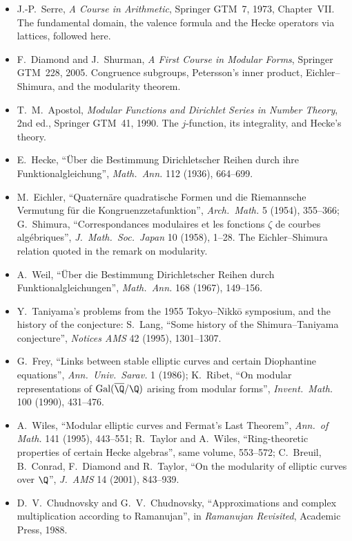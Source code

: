 \begin{itemize}
\item J.-P.~Serre, \emph{A Course in Arithmetic}, Springer GTM~7, 1973, Chapter~VII. The fundamental domain, the valence formula and the Hecke operators via lattices,
followed here.
\item F.~Diamond and J.~Shurman, \emph{A First Course in Modular Forms}, Springer GTM~228, 2005. Congruence subgroups, Petersson's inner product, Eichler--Shimura, and the
modularity theorem.
\item T.~M.~Apostol, \emph{Modular Functions and Dirichlet Series in Number Theory}, 2nd ed., Springer GTM~41, 1990. The $j$-function, its integrality, and Hecke's theory.
\item E.~Hecke, ``\"Uber die Bestimmung Dirichletscher Reihen durch ihre Funktionalgleichung'', \emph{Math.\ Ann.} 112 (1936), 664--699.
\item M.~Eichler, ``Quatern\"are quadratische Formen und die Riemannsche Vermutung f\"ur die Kongruenzzetafunktion'', \emph{Arch.\ Math.} 5 (1954), 355--366;
G.~Shimura, ``Correspondances modulaires et les fonctions $\zeta$ de courbes alg\'ebriques'', \emph{J.\ Math.\ Soc.\ Japan} 10 (1958), 1--28.
The Eichler--Shimura relation quoted in the remark on modularity.
\item A.~Weil, ``\"Uber die Bestimmung Dirichletscher Reihen durch Funktionalgleichungen'', \emph{Math.\ Ann.} 168 (1967), 149--156.
\item Y.~Taniyama's problems from the 1955 Tokyo--Nikk\=o symposium, and the history of the conjecture: S.~Lang, ``Some history of the Shimura--Taniyama conjecture'',
\emph{Notices AMS} 42 (1995), 1301--1307.
\item G.~Frey, ``Links between stable elliptic curves and certain Diophantine equations'', \emph{Ann.\ Univ.\ Sarav.} 1 (1986); K.~Ribet, ``On modular representations of
$\mathrm{Gal}(\overline{\Q}/\Q)$ arising from modular forms'', \emph{Invent.\ Math.} 100 (1990), 431--476.
\item A.~Wiles, ``Modular elliptic curves and Fermat's Last Theorem'', \emph{Ann.\ of Math.} 141 (1995), 443--551; R.~Taylor and A.~Wiles, ``Ring-theoretic properties of certain
Hecke algebras'', same volume, 553--572; C.~Breuil, B.~Conrad, F.~Diamond and R.~Taylor, ``On the modularity of elliptic curves over $\Q$'', \emph{J.\ AMS} 14 (2001), 843--939.
\item D.~V.~Chudnovsky and G.~V.~Chudnovsky, ``Approximations and complex multiplication according to Ramanujan'', in \emph{Ramanujan Revisited}, Academic Press, 1988.
\end{itemize}
